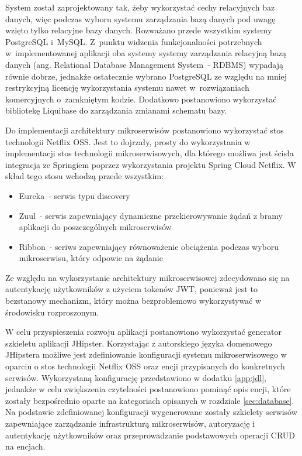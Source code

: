 \par
System został zaprojektowany tak, żeby wykorzystać cechy relacyjnych baz danych,
więc podczas wyboru systemu zarządzania bazą danych pod uwagę wzięto tylko relacyjne bazy danych.
Rozważano przede wszystkim systemy PostgreSQL\cite{tech:postgresql} i~MySQL\cite{tech:mysql}.
Z~punktu widzenia funkcjonalności potrzebnych w~implementowanej aplikacji oba systemy systemy zarządzania relacyjną bazą danych (ang. Relational Database Management System~- RDBMS) wypadają równie dobrze,
jednakże ostatecznie wybrano PostgreSQL ze względu na mniej restrykcyjną licencję wykorzystania systemu nawet w~rozwiązaniach komercyjnych o~zamkniętym kodzie.
Dodatkowo postanowiono wykorzystać bibliotekę Liquibase\cite{tech:liquibase} do zarządzania zmianami schematu bazy.

\par
Do implementacji architektury mikroserwisów postanowiono wykorzystać stos technologii Netflix OSS\cite{tech:netflix-oss}.
Jest to dojrzały, prosty do wykorzystania w implementacji stos technologii mikroserwisowych,
dla którego możliwa jest ścisła integracja ze Springiem poprzez wykorzystania projektu Spring Cloud Netflix\cite{tech:spring-cloud-netflix}.
W skład tego stosu wchodzą przede wszystkim:
\begin{itemize}
    \item Eureka\cite{tech:netflix-eureka}~- serwis typu discovery
    \item Zuul\cite{tech:netflix-zuul}~- serwis zapewniający dynamiczne przekierowywanie żądań z bramy aplikacji do poszczególnych mikroserwisów
    \item Ribbon\cite{tech:netflix-ribbon}~- seriws zapewniający równoważenie obciążenia podczas wyboru mikroserwisu, który odpowie na żądanie
\end{itemize}

\par
Ze względu na wykorzystanie architektury mikroserwisowej zdecydowano się na autentykację użytkowników z użyciem tokenów JWT\cite{url:jwt},
ponieważ jest to bezstanowy mechanizm, który można bezproblemowo wykorzystywać w środowisku rozproszonym.

\par
W celu przyspieszenia rozwoju aplikacji postanowiono wykorzystać generator szkieletu aplikacji JHipster\cite{tech:jhipster}.
Korzystając z autorskiego języka domenowego JHipstera możliwe jest zdefiniowanie konfiguracji systemu mikroserwisowego w oparciu o stos technologii Netflix OSS oraz encji przypisanych do konkretnych serwisów.
Wykorzystaną konfigurację przedstawiono w dodatku \ref{app:jdl}, jednakże w celu zwiększenia czytelności postanowiono pominąć opis encji, które zostały bezpośrednio oparte na kategoriach opisanych w rozdziale \ref{sec:database}.
Na podstawie zdefiniowanej konfiguracji wygenerowane zostały szkielety serwisów zapewniające zarządzanie infrastrukturą mikroserwisów, autoryzację i autentykację użytkowników oraz przeprowadzanie podstawowych operacji CRUD na encjach.

